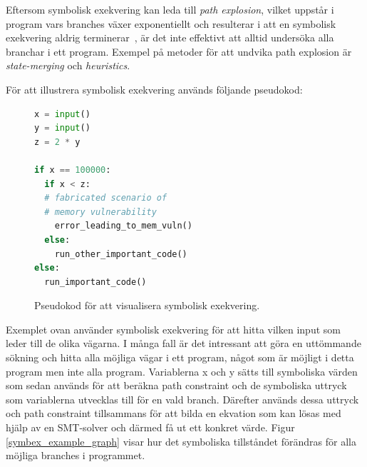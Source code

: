Eftersom symbolisk exekvering kan leda till \emph{path explosion}, vilket
uppstår i program vars branches växer exponentiellt och resulterar i att en
symbolisk exekvering aldrig terminerar~\cite{path_explo}, är det inte effektivt
att alltid undersöka alla branchar i ett program. Exempel på metoder för att
undvika path explosion är \emph{state-merging} och \emph{heuristics}. 

För att illustrera symbolisk exekvering används följande pseudokod:

\begin{figure}[H]
\centering
\begin{lstlisting}[label={list:first}, language=Python, frame=single]
x = input()
y = input()
z = 2 * y

if x == 100000: 
  if x < z:
  # fabricated scenario of 
  # memory vulnerability
    error_leading_to_mem_vuln()
  else:
    run_other_important_code()
else:
  run_important_code()

\end{lstlisting}
\caption{Pseudokod för att visualisera symbolisk exekvering.}
\label{symbex_example_code}
\end{figure}

Exemplet ovan använder symbolisk exekvering för att hitta vilken input som leder
till de olika vägarna. I många fall är det intressant att göra en uttömmande
sökning och hitta alla möjliga vägar i ett program, något som är möjligt i detta
program men inte alla program. Variablerna x och y sätts till symboliska värden
som sedan används för att beräkna path constraint och de symboliska uttryck som
variablerna utvecklas till för en vald branch. Därefter används dessa uttryck
och path constraint tillsammans för att bilda en ekvation som kan lösas med
hjälp av en SMT-solver och därmed få ut ett konkret värde. Figur
\ref{symbex_example_graph} visar hur
det symboliska tillståndet förändras för alla möjliga branches i programmet.

